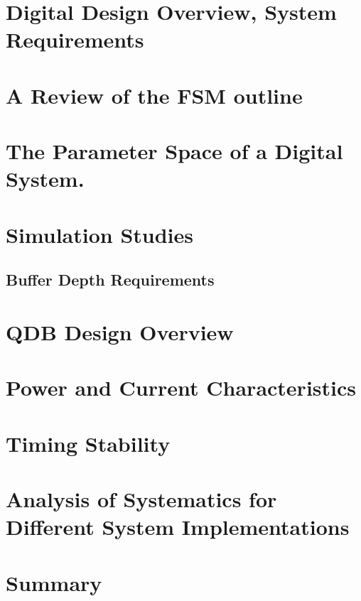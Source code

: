 \section{Digital Design Overview, System Requirements}

\section{A Review of the FSM outline}

\section{The Parameter Space of a Digital System.}

\section{Simulation Studies}

\subsection{Buffer Depth Requirements}

\section{QDB Design Overview}

\section{Power and Current Characteristics}

\section{Timing Stability}

\section{Analysis of Systematics for Different System Implementations}

\section{Summary}